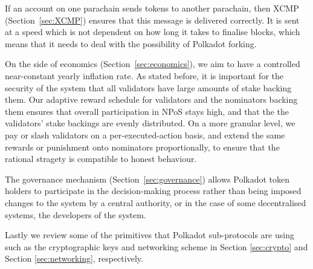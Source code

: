If an account on one parachain sends tokens to another parachain, then XCMP (Section~\ref{sec:XCMP}) ensures that this message is delivered correctly. It is sent at a speed which is not dependent on how long it takes to finalise blocks, which means that it needs to deal with the possibility of Polkadot forking. 

On the side of economics (Section~\ref{sec:economics}), we aim to have a controlled near-constant yearly inflation rate. As stated before, it is important for the security of the system that all validators have large amounts of stake backing them. Our adaptive reward schedule for validators and the nominators backing them ensures that overall participation in NPoS stays high, and that the the validators' stake backings are evenly distributed. On a more granular level, we pay or slash validators on a per-executed-action basis, and extend the same rewards or punishment onto nominators proportionally, to ensure that the rational stragety is compatible to honest behaviour.

The governance mechanism (Section~\ref{sec:governance}) allows Polkadot token holders to participate in the decision-making process rather than being imposed changes to the system by a central authority, or in the case of some decentralised systems, the developers of the system.

Lastly we review some of the primitives that Polkadot sub-protocols are using such as the cryptographic keys and networking scheme in Section \ref{sec:crypto} and Section \ref{sec:networking}, respectively. %







